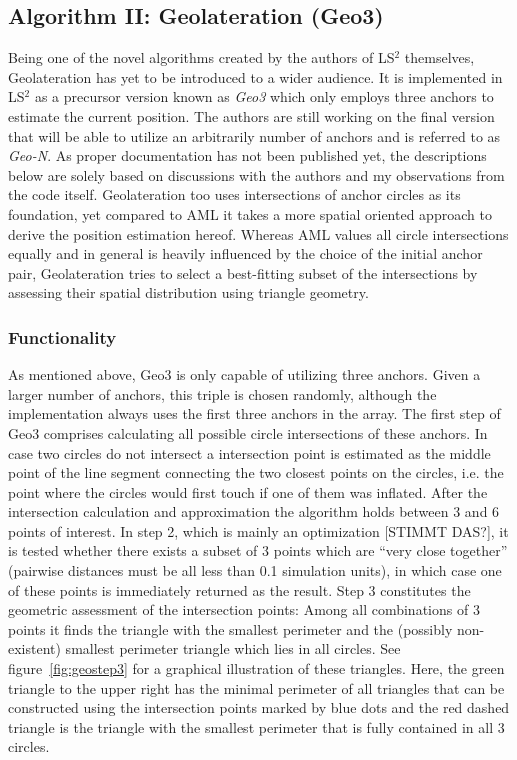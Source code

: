 \subsection{Algorithm II: Geolateration (Geo3)}
Being one of the novel algorithms created by the authors of LS$^{2}$ themselves, Geolateration has yet to be introduced to a wider audience. It is implemented in LS$^{2}$ as a precursor version known as \emph{Geo3} which only employs three anchors to estimate the current position. The authors are still working on the final version that will be able to utilize an arbitrarily number of anchors and is referred to as \emph{Geo-N}. As proper documentation has not been published yet, the descriptions below are solely based on discussions with the authors and my observations from the code itself. Geolateration too uses intersections of anchor circles as its foundation, yet compared to AML it takes a more spatial oriented approach to derive the position estimation hereof. Whereas AML values all circle intersections equally and in general is heavily influenced by the choice of the initial anchor pair, Geolateration tries to select a best-fitting subset of the intersections by assessing their spatial distribution using triangle geometry.

\subsubsection{Functionality}
As mentioned above, Geo3 is only capable of utilizing three anchors. Given a larger number of anchors, this triple is chosen randomly, although the implementation always uses the first three anchors in the array. The first step of Geo3 comprises calculating all possible circle intersections of these anchors. In case two circles do not intersect a intersection point is estimated as the middle point of the line segment connecting the two closest points on the circles, i.e. the point where the circles would first touch if one of them was inflated. After the intersection calculation and approximation the algorithm holds between 3 and 6 points of interest. In step 2, which is mainly an optimization [STIMMT DAS?], it is tested whether there exists a subset of 3 points which are ``very close together'' (pairwise distances must be all less than 0.1 simulation units), in which case one of these points is immediately returned as the result. Step 3 constitutes the geometric assessment of the intersection points: Among all combinations of 3 points it finds the triangle with the smallest perimeter and the (possibly non-existent) smallest perimeter triangle which lies in all circles. See figure~\ref{fig:geostep3} for a graphical illustration of these triangles. Here, the green triangle to the upper right has the minimal perimeter of all triangles that can be constructed using the intersection points marked by blue dots and the red dashed triangle is the triangle with the smallest perimeter that is fully contained in all 3 circles.

